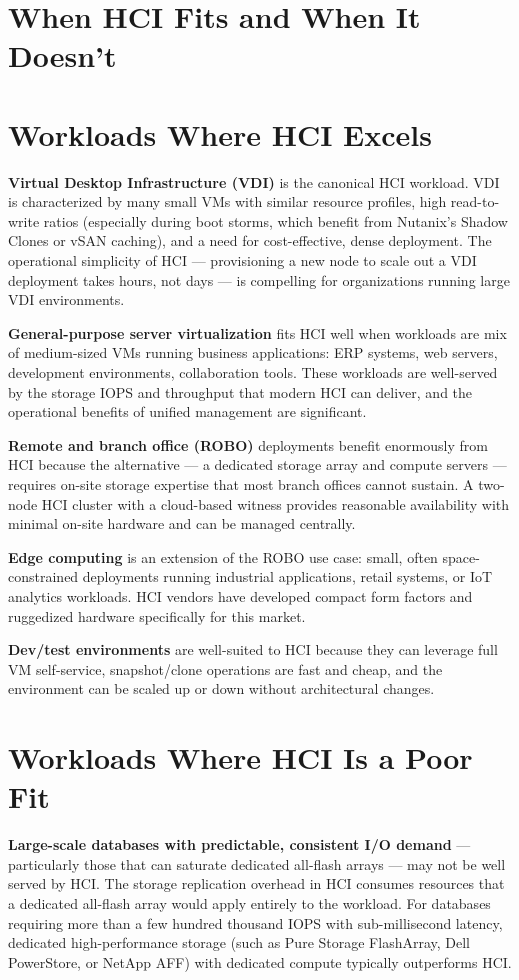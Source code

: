 \section{When HCI Fits and When It Doesn't}
\section{Workloads Where HCI Excels}
\textbf{Virtual Desktop Infrastructure (VDI)} is the canonical HCI workload. VDI is characterized by many small VMs with similar resource profiles, high read-to-write ratios (especially during boot storms, which benefit from Nutanix's Shadow Clones or vSAN caching), and a need for cost-effective, dense deployment. The operational simplicity of HCI --- provisioning a new node to scale out a VDI deployment takes hours, not days --- is compelling for organizations running large VDI environments.

\textbf{General-purpose server virtualization} fits HCI well when workloads are mix of medium-sized VMs running business applications: ERP systems, web servers, development environments, collaboration tools. These workloads are well-served by the storage IOPS and throughput that modern HCI can deliver, and the operational benefits of unified management are significant.

\textbf{Remote and branch office (ROBO)} deployments benefit enormously from HCI because the alternative --- a dedicated storage array and compute servers --- requires on-site storage expertise that most branch offices cannot sustain. A two-node HCI cluster with a cloud-based witness provides reasonable availability with minimal on-site hardware and can be managed centrally.

\textbf{Edge computing} is an extension of the ROBO use case: small, often space-constrained deployments running industrial applications, retail systems, or IoT analytics workloads. HCI vendors have developed compact form factors and ruggedized hardware specifically for this market.

\textbf{Dev/test environments} are well-suited to HCI because they can leverage full VM self-service, snapshot/clone operations are fast and cheap, and the environment can be scaled up or down without architectural changes.

\section{Workloads Where HCI Is a Poor Fit}
\textbf{Large-scale databases with predictable, consistent I/O demand} --- particularly those that can saturate dedicated all-flash arrays --- may not be well served by HCI. The storage replication overhead in HCI consumes resources that a dedicated all-flash array would apply entirely to the workload. For databases requiring more than a few hundred thousand IOPS with sub-millisecond latency, dedicated high-performance storage (such as Pure Storage FlashArray, Dell PowerStore, or NetApp AFF) with dedicated compute typically outperforms HCI.

